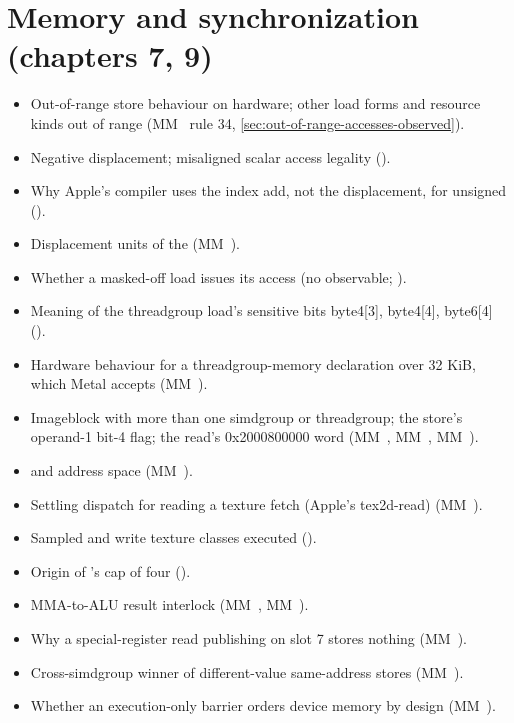 \section{Memory and synchronization (chapters 7, 9)}\label{sec:memory-synchronization-chapters}

\begin{itemize}
\item Out-of-range store behaviour on hardware; other load forms and resource kinds out of range (MM~ rule 34, \cref{sec:out-of-range-accesses-observed}).
\item Negative displacement; misaligned scalar access legality ().
\item Why Apple's compiler uses the index add, not the displacement, for unsigned  ().
\item Displacement units of the  (MM~).
\item Whether a masked-off load issues its access (no observable; ).
\item Meaning of the threadgroup load's sensitive bits byte4{[}3{]}, byte4{[}4{]}, byte6{[}4{]} ().
\item Hardware behaviour for a threadgroup-memory declaration over 32 KiB, which Metal accepts (MM~).
\item Imageblock with more than one simdgroup or threadgroup; the store's operand-1 bit-4 flag; the read's 0x2000800000 word
  (MM~, MM~, MM~).
\item {} and  address space (MM~).
\item Settling dispatch for  reading a texture fetch (Apple's tex2d-read) (MM~).
\item Sampled and write texture classes executed ().
\item Origin of 's cap of four ().
\item MMA-to-ALU result interlock (MM~, MM~).
\item Why a special-register read publishing on slot 7 stores nothing (MM~).
\item Cross-simdgroup winner of different-value same-address stores (MM~).
\item Whether an execution-only barrier orders device memory by design (MM~).

\end{itemize}
